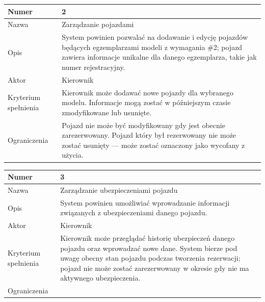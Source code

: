 \documentclass[eng,printmode,openany]{mgr}
\begin{document}
	\begin{table}[H]
		\begin{tabularx}{\textwidth}{|l|X|}
			\hline
			Numer                & 2 \\ \hline
			Nazwa                & Zarządzanie pojazdami \\ \hline
			Opis                 & System powinien pozwalać na dodawanie i edycję pojazdów będących egzemplarzami modeli z wymagania \#2; pojazd zawiera informacje unikalne dla danego egzemplarza, takie jak numer rejestracyjny.     \\ \hline
			Aktor                & Kierownik \\ \hline
			Kryterium spełnienia & Kierownik może dodawać nowe pojazdy dla wybranego modelu. Informacje mogą zostać w późniejszym czasie zmodyfikowane lub usunięte.\\ \hline
			Ograniczenia         & Pojazd nie może być modyfikowany gdy jest obecnie zarezerwowany. Pojazd który był rezerwowany nie może zostać usunięty — może zostać oznaczony jako wycofany z użycia. \\ \hline
		\end{tabularx}
	\end{table}
	
	\begin{table}[H]
		\begin{tabularx}{\textwidth}{|l|X|}
			\hline
			Numer                & 3 \\ \hline
			Nazwa                & Zarządzanie ubezpieczeniami pojazdu \\ \hline
			Opis                 & System powinien umożliwiać wprowadzanie informacji związanych z ubezpieczeniami danego pojazdu. \\ \hline
			Aktor                & Kierownik \\ \hline
			Kryterium spełnienia & Kierownik może przeglądać historię ubezpieczeń danego pojazdu oraz wprowadzać nowe dane. System bierze pod uwagę obecny stan pojazdu podczas tworzenia rezerwacji;  pojazd nie może zostać zarezerwowany w okresie gdy nie ma aktywnego ubezpieczenia. \\ \hline
			Ograniczenia         & \\ \hline
		\end{tabularx}
	\end{table}
	
\end{document}
